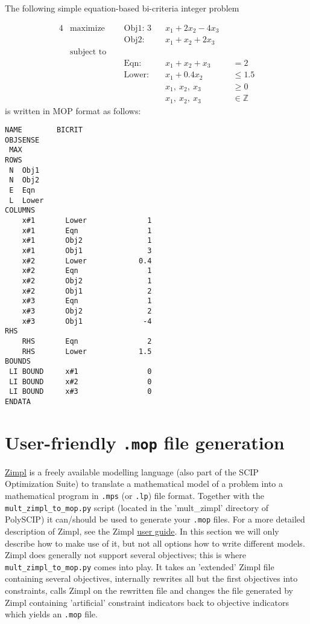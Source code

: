 \documentclass[11pt,listof=totoc]{scrartcl}
\theoremstyle{definition}
\begin{document}
The following simple equation-based bi-criteria
integer problem

\begin{alignat*}{4}
&\mbox{maximize}~~~ &&\mbox{Obj1: } 3&&x_1 + 2 x_2 - 4 x_3 &&\\
& &&\mbox{Obj2: } &&x_1 + x_2 + 2 x_3 &&\\
&\mbox{subject to} && && && \\
& &&\mbox{Eqn: } &&x_1 + x_2 + x_3 &&= 2 \\
& &&\mbox{Lower: } &&x_1 + 0.4 x_2 &&\leq 1.5 \\
& && &&x_1,~ x_2,~ x_3 &&\geq 0 \\
& && &&x_1,~ x_2,~ x_3 &&\in \mathbb{Z}
\end{alignat*}
is written in MOP format as follows:
\begin{verbatim}
NAME        BICRIT
OBJSENSE
 MAX
ROWS
 N  Obj1
 N  Obj2
 E  Eqn
 L  Lower
COLUMNS
    x#1       Lower              1
    x#1       Eqn                1
    x#1       Obj2               1
    x#1       Obj1               3
    x#2       Lower            0.4
    x#2       Eqn                1
    x#2       Obj2               1
    x#2       Obj1               2
    x#3       Eqn                1
    x#3       Obj2               2
    x#3       Obj1              -4
RHS
    RHS       Eqn                2
    RHS       Lower            1.5
BOUNDS
 LI BOUND     x#1                0
 LI BOUND     x#2                0
 LI BOUND     x#3                0
ENDATA
\end{verbatim}

\section{User-friendly \texttt{.mop} file generation}\label{sec-model}

\href{http://zimpl.zib.de}{Zimpl} is a freely available modelling
language (also part of the SCIP Optimization Suite) to translate a
mathematical model of a problem into a mathematical program in
\texttt{.mps} (or \texttt{.lp}) file format. Together with the
\texttt{mult\_zimpl\_to\_mop.py} script (located in the 'mult\_zimpl'
directory of PolySCIP) it can/should be used to generate your
\texttt{.mop} files. For a more detailed description of Zimpl, see the
Zimpl \href{http://zimpl.zib.de/download/zimpl.pdf}{user guide}. In
this section we will only describe how to make use of it, but not all
options how to write different models. Zimpl does generally not support several
objectives; this is where \texttt{mult\_zimpl\_to\_mop.py} comes into
play. It takes an 'extended' Zimpl file containing several objectives,
internally rewrites all but the first objectives into constraints,
calls Zimpl on the rewritten file and changes the file generated by Zimpl
containing 'artificial' constraint indicators back to objective
indicators which yields an \texttt{.mop} file.
\end{document}
